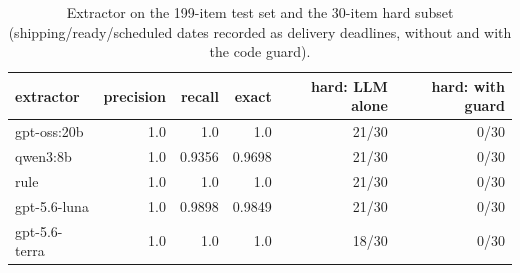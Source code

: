 \begin{table}[t]
\centering
\small
\caption{Extractor on the 199-item test set and the 30-item hard subset (shipping/ready/scheduled dates recorded as delivery deadlines, without and with the code guard).}
\label{tab:extractor}
\begin{tabular}{lrrrrr}
\toprule
extractor & precision & recall & exact & hard: LLM alone & hard: with guard \\
\midrule
gpt-oss:20b & 1.0 & 1.0 & 1.0 & 21/30 & 0/30 \\
qwen3:8b & 1.0 & 0.9356 & 0.9698 & 21/30 & 0/30 \\
rule & 1.0 & 1.0 & 1.0 & 21/30 & 0/30 \\
gpt-5.6-luna & 1.0 & 0.9898 & 0.9849 & 21/30 & 0/30 \\
gpt-5.6-terra & 1.0 & 1.0 & 1.0 & 18/30 & 0/30 \\
\bottomrule
\end{tabular}
\end{table}
